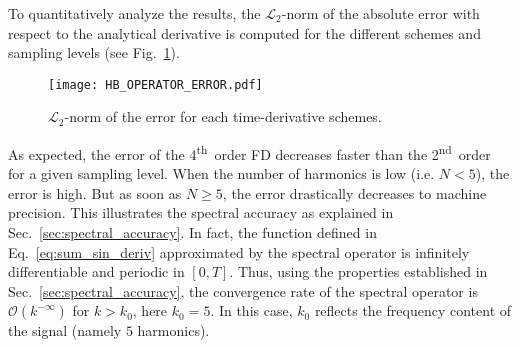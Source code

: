 To quantitatively analyze the results, the 
$\mathcal{L}_2$-norm of the absolute error with respect to the analytical
derivative is computed for the different schemes and 
sampling levels (see Fig.~\ref{fig:hb_operator_error}).
\begin{figure}
  \centering
   \texttt{[image: HB\_OPERATOR\_ERROR.pdf]}
   \caption{$\mathcal{L}_2$-norm of the error for each time-derivative
   schemes.}
  \label{fig:hb_operator_error}
\end{figure}
As expected, the error of the 4\textsuperscript{th}~order FD
decreases faster  than the 2\textsuperscript{nd}~order for a given sampling level.
When the number of harmonics is low 
(i.e. $N < 5$), the error is high. But as soon as $N \geq 5$, the error
drastically decreases to machine precision.
This illustrates the spectral accuracy as explained in 
Sec.~\ref{sec:spectral_accuracy}. In fact, the function defined
in Eq.~\eqref{eq:sum_sin_deriv} approximated by the spectral operator
is infinitely differentiable and periodic in $[0, T]$.
Thus, using the properties established in Sec.~\ref{sec:spectral_accuracy},
the convergence rate of the spectral operator is $\mathcal{O} (k^{-\infty})$
for $k > k_0$, here $k_0=5$. In this case, $k_0$
reflects the frequency content of the signal (namely $5$ harmonics).
